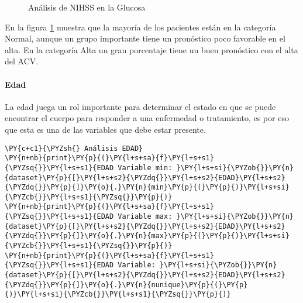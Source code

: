 \begin{center}
    	\begin{figure}[H]
	\centering
	\caption{Análisis de NIHSS en la Glucosa}
	\label{fig:aNISSg}
	\end{figure}
\end{center}
    
    En la figura \ref{fig:aNISSg} muestra que la mayoría de los pacientes están en la categoría Normal, aunque un grupo importante tiene un pronóstico poco favorable en el alta. En la categoría Alta un gran porcentaje tiene un buen pronóstico con el alta del ACV.

    \hypertarget{edad}{%
\paragraph{Edad}\label{edad}}

La edad juega un rol importante para determinar el estado en que se puede encontrar el cuerpo para responder a una enfermedad o tratamiento, es por eso que esta es una de las variables que debe estar presente.

    \begin{tcolorbox}[breakable, size=fbox, boxrule=1pt, pad at break*=1mm,colback=cellbackground, colframe=cellborder]
\begin{Verbatim}[commandchars=\\\{\}]
\PY{c+c1}{\PYZsh{} Análisis EDAD}
\PY{n+nb}{print}\PY{p}{(}\PY{l+s+sa}{f}\PY{l+s+s1}{\PYZsq{}}\PY{l+s+s1}{EDAD Variable min: }\PY{l+s+si}{\PYZob{}}\PY{n}{dataset}\PY{p}{[}\PY{l+s+s2}{\PYZdq{}}\PY{l+s+s2}{EDAD}\PY{l+s+s2}{\PYZdq{}}\PY{p}{]}\PY{o}{.}\PY{n}{min}\PY{p}{(}\PY{p}{)}\PY{l+s+si}{\PYZcb{}}\PY{l+s+s1}{\PYZsq{}}\PY{p}{)}
\PY{n+nb}{print}\PY{p}{(}\PY{l+s+sa}{f}\PY{l+s+s1}{\PYZsq{}}\PY{l+s+s1}{EDAD Variable max: }\PY{l+s+si}{\PYZob{}}\PY{n}{dataset}\PY{p}{[}\PY{l+s+s2}{\PYZdq{}}\PY{l+s+s2}{EDAD}\PY{l+s+s2}{\PYZdq{}}\PY{p}{]}\PY{o}{.}\PY{n}{max}\PY{p}{(}\PY{p}{)}\PY{l+s+si}{\PYZcb{}}\PY{l+s+s1}{\PYZsq{}}\PY{p}{)}
\PY{n+nb}{print}\PY{p}{(}\PY{l+s+sa}{f}\PY{l+s+s1}{\PYZsq{}}\PY{l+s+s1}{EDAD Variable: }\PY{l+s+si}{\PYZob{}}\PY{n}{dataset}\PY{p}{[}\PY{l+s+s2}{\PYZdq{}}\PY{l+s+s2}{EDAD}\PY{l+s+s2}{\PYZdq{}}\PY{p}{]}\PY{o}{.}\PY{n}{nunique}\PY{p}{(}\PY{p}{)}\PY{l+s+si}{\PYZcb{}}\PY{l+s+s1}{\PYZsq{}}\PY{p}{)}
\end{Verbatim}
\end{tcolorbox}

